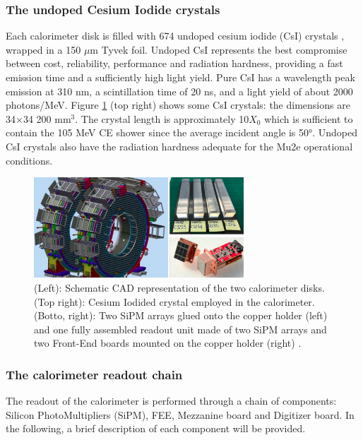 \subsubsection{The undoped Cesium Iodide crystals}
Each calorimeter disk is filled with 674 undoped cesium 
iodide (CsI) crystals \cite{em6}, wrapped in a 150 $\mu$m Tyvek foil. 
Undoped CsI represents the best compromise between cost, 
reliability, performance and radiation hardness, providing 
a fast emission time and a sufficiently high light yield. Pure 
CsI has a wavelength peak emission at 310 nm, a scintillation 
time of 20 ns, and a light yield of about 2000 photons/MeV. 
Figure \ref{fig:calo2} (top right) shows some CsI crystals: 
the dimensions are 34$\times$34 200 mm$^3$. The crystal length 
is approximately 10$X_0$ which is sufficient to contain the 105 
MeV CE shower since the average incident angle 
is 50°. Undoped CsI crystals also have the radiation hardness 
adequate for the Mu2e operational conditions. 




\begin{figure}[!h]
    \centering
    \includegraphics[width =0.7\textwidth]{figures/png/Screenshot_20240322_121000.png}
    \caption[The calorimeter components.]{(Left): Schematic CAD representation of the two calorimeter disks. (Top right): 
    Cesium Iodided crystal employed in the calorimeter. (Botto, right): Two SiPM arrays 
    glued onto the copper holder (left) and one fully assembled readout unit made of two 
    SiPM arrays and two Front-End boards mounted on the copper holder (right) \cite{em4}.}
    \label{fig:calo2}
\end{figure}


\subsubsection{The calorimeter readout chain}
The readout of the calorimeter is performed through a chain of components: Silicon PhotoMultipliers (SiPM), 
FEE, Mezzanine board and Digitizer board. In the following, 
a brief description of each component will be provided.
